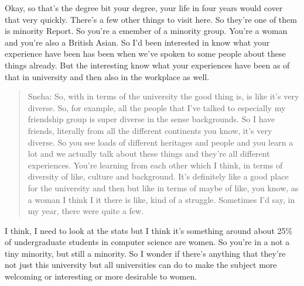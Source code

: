 \documentclass[
]{book}
\begin{document}
Okay, so that's the degree bit your degree, your life in four years would cover that very quickly. There's a few other things to visit here. So they're one of them is minority Report. So you're a emember of a minority group. You're a woman and you're also a British Asian. So I'd been interested in know what your experience have been has been when we've spoken to some people about these things already. But the interesting know what your experiences have been as of that in university and then also in the workplace as well.

\begin{quote}
Sneha: So, with in terms of the university the good thing is, is like it's very diverse. So, for example, all the people that I've talked to especially my friendship group is super diverse in the sense backgrounds. So I have friends, literally from all the different continents you know, it's very diverse. So you see loads of different heritages and people and you learn a lot and we actually talk about these things and they're all different experiences. You're learning from each other which I think, in terms of diversity of like, culture and background. It's definitely like a good place for the university and then but like in terms of maybe of like, you know, as a woman I think I it there is like, kind of a struggle. Sometimes I'd say, in my year, there were quite a few.
\end{quote}

I think, I need to look at the stats but I think it's something around about 25\% of undergraduate students in computer science are women. So you're in a not a tiny minority, but still a minority. So I wonder if there's anything that they're not just this university but all universities can do to make the subject more welcoming or interesting or more desirable to women.
\end{document}
